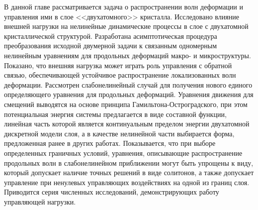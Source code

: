 

В данной главе рассматривается задача о распространении волн деформации и управления ими в слое <<двухатомного>> кристалла. Исследовано влияние внешней нагрузки на нелинейные динамические процессы в слое с двухатомной кристаллической структурой. Разработана асимптотическая процедура преобразования исходной двумерной задачи к связанным одномерным нелинейным уравнениям для продольных деформаций макро- и микроструктуры. Показано, что внешняя нагрузка может играть роль управления с обратной связью, обеспечивающей устойчивое распространение локализованных волн деформации. Рассмотрен слабонелинейный случай для получения нового единого определяющего уравнения для продольных деформаций. Уравнения движения для смещений выводятся на основе принципа Гамильтона-Остроградского, при этом потенциальная энергия системы предлагается в виде составной функции, линейная часть которой является континуальным пределом энергии двухатомной дискретной модели слоя, а в качестве нелинейной части выбирается форма, предложенная ранее в других работах. Показывается, что при выборе определенных граничных условий, уравнения, описывающие распространение продольных волн в слабонелинейном приближении могут быть упрощены к виду, который допускает наличие точных решений в виде солитонов, а также допускает управление при ненулевых управляющих воздействиях на одной из границ слоя. Приводится серия численных исследований, демонстрирующих работу управляющей нагрузки.

